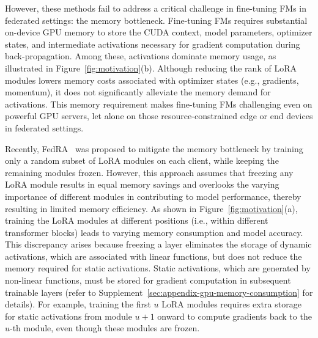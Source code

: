 \documentclass[sigconf]{acmart}
\begin{document}
However, these methods fail to address a critical challenge in fine-tuning FMs in federated settings: the memory bottleneck. Fine-tuning FMs requires substantial on-device GPU memory to store the CUDA context, model parameters, optimizer states, and intermediate activations necessary for gradient computation during back-propagation. Among these, activations dominate memory usage, as illustrated in Figure~\ref{fig:motivation}(b). 
% 
Although reducing the rank of LoRA modules lowers memory costs associated with optimizer states (e.g., gradients, momentum), it does not significantly alleviate the memory demand for activations.
% 
This memory requirement makes fine-tuning FMs challenging even on powerful GPU servers, let alone on those resource-constrained edge or end devices in federated settings. 
% 

Recently, FedRA~\cite{su2023fedra} was proposed to mitigate the memory bottleneck by training only a random subset of LoRA modules on each client, while keeping the remaining modules frozen. However, this approach assumes that freezing any LoRA module results in equal memory savings and overlooks the varying importance of different modules in contributing to model performance, thereby resulting in limited memory efficiency. 
As shown in Figure~\ref{fig:motivation}(a), training the LoRA modules
at different positions (i.e., within different transformer blocks) leads to varying memory consumption and model accuracy. This discrepancy arises because freezing a layer eliminates the storage of dynamic activations, which are associated with linear functions, but does not reduce the memory required for static activations. Static activations, which are generated by non-linear functions, must be stored for gradient computation in subsequent trainable layers (refer to {{Supplement~\ref{sec:appendix-gpu-memory-consumption}}} for details). For example, training the first $u$ LoRA modules requires extra storage for static activations from module $u+1$ onward to compute gradients back to the $u$-th module, even though these modules are frozen. 
\end{document}

